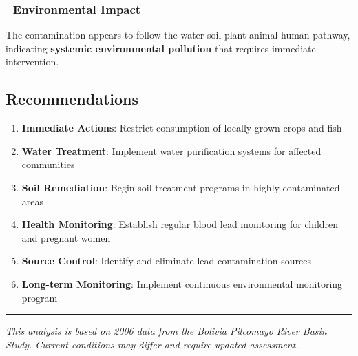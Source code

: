 \documentclass[
]{article}
\providecommand{\tightlist}{%
  \setlength{\itemsep}{0pt}\setlength{\parskip}{0pt}}
\begin{document}
\subsubsection{\texorpdfstring{🔬 \textbf{Environmental
Impact}}{🔬 Environmental Impact}}\label{environmental-impact}

The contamination appears to follow the water-soil-plant-animal-human
pathway, indicating \textbf{systemic environmental pollution} that
requires immediate intervention.

\subsection{Recommendations}\label{recommendations}

\begin{enumerate}
\def\labelenumi{\arabic{enumi}.}
\tightlist
\item
  \textbf{Immediate Actions}: Restrict consumption of locally grown
  crops and fish
\item
  \textbf{Water Treatment}: Implement water purification systems for
  affected communities\\
\item
  \textbf{Soil Remediation}: Begin soil treatment programs in highly
  contaminated areas
\item
  \textbf{Health Monitoring}: Establish regular blood lead monitoring
  for children and pregnant women
\item
  \textbf{Source Control}: Identify and eliminate lead contamination
  sources
\item
  \textbf{Long-term Monitoring}: Implement continuous environmental
  monitoring program
\end{enumerate}

\begin{center}\rule{0.5\linewidth}{0.5pt}\end{center}

\emph{This analysis is based on 2006 data from the Bolivia Pilcomayo
River Basin Study. Current conditions may differ and require updated
assessment.}
\end{document}

